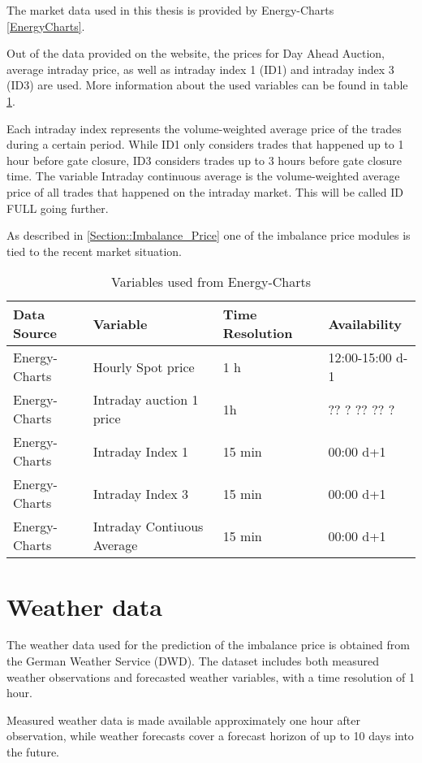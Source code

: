 \documentclass[class=scrbook, crop=false]{standalone}
\begin{document}
The market data used in this thesis is provided by Energy-Charts \ref{EnergyCharts}.


Out of the data provided on the website, the prices for Day Ahead Auction, average intraday price, as well as intraday index 1 (ID1) and intraday index 3 (ID3) are used. 
More information about the used variables can be found in table \ref{Table::Market_Data}.

Each intraday index represents the volume-weighted average price of the trades during a certain period. 
While ID1 only considers trades that happened up to 1 hour before gate closure, ID3 considers trades up to 3 hours before gate closure time.
The variable Intraday continuous average is the volume-weighted average price of all trades that happened on the intraday market. 
This will be called ID FULL going further.

As described in \ref{Section::Imbalance_Price} one of the imbalance price modules is tied to the recent market situation.	

    
\begin{table}[]
\begin{tabular}{l|l|l|l}
 Data Source & Variable &  Time Resolution & Availability  \\\hline
 Energy-Charts & Hourly Spot price& 1 h& 12:00-15:00 d-1 \\
 Energy-Charts & Intraday auction 1 price & 1h & ?? ? ?? ?? ?\\
 Energy-Charts & Intraday Index 1 & 15 min &  00:00 d+1\\
 Energy-Charts & Intraday Index 3 & 15 min &  00:00 d+1\\
 Energy-Charts & Intraday Contiuous Average & 15 min &  00:00 d+1\\
   
\end{tabular}
\caption{Variables used from Energy-Charts}
\label{Table::Market_Data}
\end{table}

\section{Weather data}
\label{Section::Weather_Data}

The weather data used for the prediction of the imbalance price is obtained from the German Weather Service (DWD).
The dataset includes both measured weather observations and forecasted weather variables, with a time resolution of 1 hour.

Measured weather data is made available approximately one hour after observation, while weather forecasts cover a forecast horizon of up to 10 days into the future.
\end{document}
